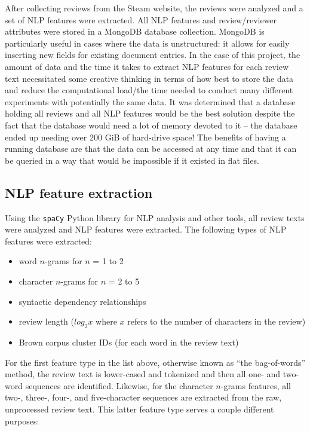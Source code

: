 \documentclass[9pt]{article}
\begin{document}
After collecting reviews from the Steam website, the reviews were analyzed and a set of NLP features were extracted. All NLP features and review/reviewer attributes were stored in a MongoDB database collection. MongoDB is particularly useful in cases where the data is unstructured: it allows for easily inserting new fields for existing document entries. In the case of this project, the amount of data and the time it takes to extract NLP features for each review text necessitated some creative thinking in terms of how best to store the data and reduce the computational load/the time needed to conduct many different experiments with potentially the same data. It was determined that a database holding all reviews and all NLP features would be the best solution despite the fact that the database would need a lot of memory devoted to it -- the database ended up needing over 200 GiB of hard-drive space! The benefits of having a running database are that the data can be accessed at any time and that it can be queried in a way that would be impossible if it existed in flat files.

\subsection{NLP feature extraction}
\label{ssec:nlp_features}

Using the {\tt spaCy} Python library for NLP analysis and other tools, all review texts were analyzed and NLP features were extracted. The following types of NLP features were extracted:

\begin{itemize}
\item word $n$-grams for $n$ = 1 to 2
\item character $n$-grams for $n$ = 2 to 5
\item syntactic dependency relationships
\item review length ($log_2 x$ where $x$ refers to the number of characters in the review)
\item Brown corpus cluster IDs (for each word in the review text)
\end{itemize}

For the first feature type in the list above, otherwise known as ``the bag-of-words'' method, the review text is lower-cased and tokenized and then all one- and two-word sequences are identified. Likewise, for the character $n$-grams features, all two-, three-, four-, and five-character sequences are extracted from the raw, unprocessed review text. This latter feature type serves a couple different purposes:
\end{document}
